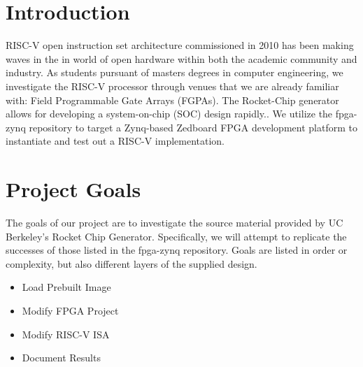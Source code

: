 \documentclass[journal]{IEEEtran}
\begin{document}
\section{Introduction}
% 
% 
% 
% 
 RISC-V open instruction set architecture commissioned in 2010 has been making waves in the in world of open hardware within both the academic community and industry. As students pursuant of masters degrees in computer engineering, we investigate the RISC-V processor through venues that we are already familiar with: Field Programmable Gate Arrays (FGPAs).
\newline The Rocket-Chip generator allows for developing a system-on-chip (SOC) design rapidly.\cite{Asanović:EECS-2016-17}. We utilize the fpga-zynq \cite{fpga-zynq} repository to target a Zynq-based Zedboard FPGA development platform to instantiate and test out a RISC-V implementation.


\section{Project Goals}
The goals of our project are to investigate the source material provided by UC Berkeley's Rocket Chip Generator. Specifically, we will attempt to replicate the successes of those listed in the fpga-zynq \cite{fpga-zynq} repository. Goals are listed in order or complexity, but also different layers of the supplied design. 
\begin{itemize}
\item{Load Prebuilt Image}%
\item{Modify FPGA Project}
\item{Modify RISC-V ISA}
\item{Document Results}
\end{itemize}
\end{document}

